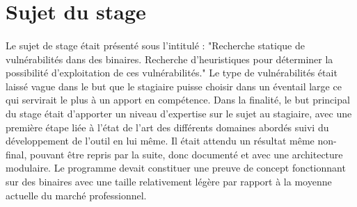 \section*{Sujet du stage}
\paragraph{}
Le sujet de stage était présenté sous l'intitulé : "Recherche statique de vulnérabilités dans des binaires. Recherche d'heuristiques pour déterminer la possibilité d'exploitation
de ces vulnérabilités." Le type de vulnérabilités était laissé vague dans le but que le stagiaire puisse choisir dans un éventail large ce qui servirait le plus à un apport en compétence.
Dans la finalité, le but principal du stage était d'apporter un niveau d'expertise sur le sujet au stagiaire, avec une première étape liée à l'état de l'art des différents domaines abordés
 suivi du développement de l'outil en lui même. Il était attendu un résultat même non-final, pouvant être repris par la suite, donc documenté et avec une architecture modulaire. Le programme
devait constituer une preuve de concept fonctionnant sur des binaires avec une taille relativement légère par rapport à la moyenne actuelle du marché professionnel.
